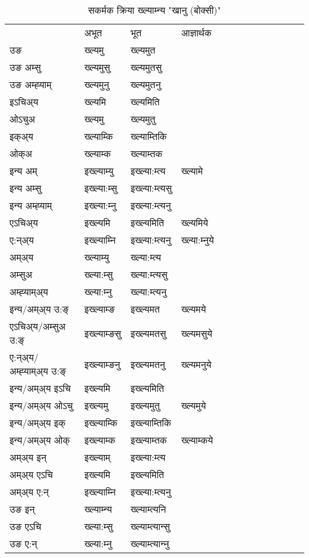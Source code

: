 \begin{table}[H]
\label{ɛm.vt} \centering
\caption{सकर्मक क्रिया  ख्ल्याम्‍न्य  "खानु (बोक्सी)"  }
\begin{tabular}{l|l|l|l|l|l|l|l|l|l|l|l|l}  \toprule
&अभूत & भूत & आज्ञार्थक \\ 
उङ &ख्ल्यमु &ख्ल्यमुत \\ 
उङ अम्सु &ख्ल्यमुसु &ख्ल्यमुतसु \\ 
उङ अम्ह्‍याम् &ख्ल्यमुनु &ख्ल्यमुतनु \\ 
इऽचिअ्य &ख्ल्यमि &ख्ल्यमिति   \\ 
ओऽचुअ &ख्ल्यमु &ख्ल्यमुतु   \\ 
इक्अ्य &ख्ल्याम्कि &ख्ल्याम्तिकि   \\ 
ओक्अ &ख्ल्याम्क &ख्ल्याम्तक   \\ 
इन्य अम् & इख्ल्याम्यु  & इख्ल्या:म्त्य &ख्ल्यामे  \\ 
इन्य अम्सु & इख्ल्या:म्सु  & इख्ल्या:म्त्यसु   \\ 
इन्य अम्ह्‍याम् & इख्ल्या:म्‍नु  & इख्ल्या:म्त्यनु   \\ 
एऽचिअ्य & इख्ल्यमि & इख्ल्यमिति &ख्ल्यमिये    \\ 
ए:न्अ्य & इख्ल्याम्‍नि  & इख्ल्या:म्त्यनु &ख्ल्या:म्‍नुये  \\ 
अम्अ्य & ख्ल्याम्यु  & ख्ल्या:म्त्य  \\ 
अम्सुअ & ख्ल्या:म्सु & ख्ल्या:म्त्यसु  \\ 
अम्ह्‍याम्अ्य & ख्ल्या:म्‍नु  & ख्ल्या:म्त्यनु \\ 
\midrule
इन्य/अम्अ्य उ:ङ्‌&इख्ल्याम्ङ & इख्ल्यमत &ख्ल्यमये \\ 
एऽचिअ्य/अम्सुअ उ:ङ्‌ &इख्ल्याम्ङसु & इख्ल्यमतसु &ख्ल्यमसुये \\ 
ए:न्अ्य/अम्ह्‍याम्अ्य उ:ङ्‌ &इख्ल्याम्ङनु & इख्ल्यमतनु &ख्ल्यमनुये \\ 
इन्य/अम्अ्य इऽचि & इख्ल्यमि & इख्ल्यमिति    \\ 
इन्य/अम्अ्य ओऽचु & इख्ल्यमु & इख्ल्यमुतु  &ख्ल्यमुये  \\ 
इन्य/अम्अ्य इक् & इख्ल्याम्कि & इख्ल्याम्तिकि   \\ 
इन्य/अम्अ्य ओक् & इख्ल्याम्क & इख्ल्याम्तक  &ख्ल्याम्कये  \\ 
अम्अ्य इन् & इख्ल्याम् & इख्ल्या:म्त्य   \\ 
अम्अ्य एऽचि & इख्ल्यमि & इख्ल्यमिति    \\ 
अम्अ्य ए:न् & इख्ल्याम्‍नि  & इख्ल्या:म्त्यनु  \\ 
\midrule
उङ इन् & ख्ल्याम्‍न्य  & ख्ल्याम्त्यनि  \\ 
उङ एऽचि & ख्ल्या:म्सु  & ख्ल्याम्त्यान्सु   \\ 
उङ ए:न्& ख्ल्या:म्‍नु  & ख्ल्याम्त्यान्‍नु   \\ 
\bottomrule
\end{tabular}
\end{table}


